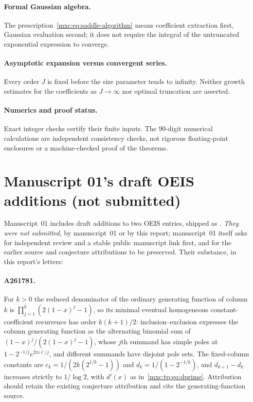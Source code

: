 \documentclass[11pt]{article}
\numberwithin{equation}{section}
\theoremstyle{definition}
\theoremstyle{remark}
\begin{document}
\paragraph{Formal Gaussian algebra.} The
prescription~\eqref{mxc:eq:saddle-algorithm} means coefficient extraction
first, Gaussian evaluation second; it does not require the integral of
the untruncated exponential expression to converge.

\paragraph{Asymptotic expansion versus convergent series.} Every order $J$
is fixed before the size parameter tends to infinity. Neither growth
estimates for the coefficients as $J\to\infty$ nor optimal truncation are
asserted.

\paragraph{Numerics and proof status.} Exact integer checks certify their
finite inputs. The 90-digit numerical calculations are independent
consistency checks, not rigorous floating-point enclosures or a
machine-checked proof of the theorems.

\section{Manuscript 01's draft OEIS additions (not submitted)}\label{mxc:tp:sec:oeis}

Manuscript~01 includes draft additions to two OEIS entries, shipped as
. \emph{They were not
submitted}, by manuscript~01 or by this report; manuscript~01 itself asks
for independent review and a stable public manuscript link first, and for
the earlier source and conjecture attributions to be preserved. Their
substance, in this report's letters:

\paragraph{A261781.} For $k>0$ the reduced denominator of the ordinary
generating function of column $k$ is $\prod_{j=1}^k(2(1-x)^j-1)$, so its
minimal eventual homogeneous constant-coefficient recurrence has order
$k(k+1)/2$: inclusion--exclusion expresses the column generating function
as the alternating binomial sum of $(1-x)^j/(2(1-x)^j-1)$, whose $j$th
summand has simple poles at $1-2^{-1/j}e^{2\pi i\ell/j}$, and different
summands have disjoint pole sets. The fixed-column constants are
$c_k=1/(2k(2^{1/k}-1))$ and $d_k=1/(1-2^{-1/k})$, and $d_{k+1}-d_k$
increases strictly to $1/\log2$, with $d'(x)$ as
in~\eqref{mxc:tp:eq:dprime}. Attribution should retain the existing
conjecture attribution and cite the generating-function source.
\end{document}
